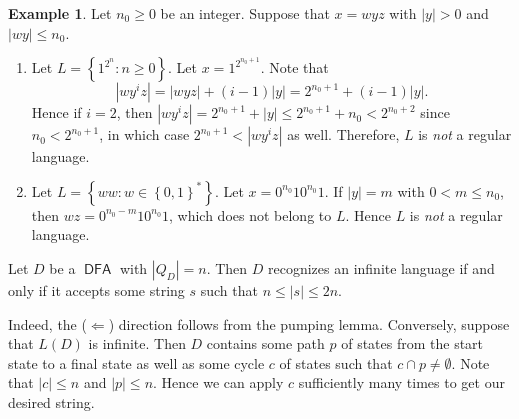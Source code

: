 \documentclass[10pt,letterpaper,cm]{nupset}
\theoremstyle{definition}
\newtheorem{exmp}[definition]{Example}
\theoremstyle{theorem}
\theoremstyle{remark}
\newcommand{\1}{\mathbf{1}}
\newcommand{\0}{\vec 0}
\DeclareMathOperator{\DFA}{\mathsf{DFA}}
\begin{document}
\begin{exmp} Let $n_0\geq 0$ be an integer. Suppose that $x=wyz$ with $\left\lvert{y}\right\rvert >0$ and $\left\lvert{wy}\right\rvert\leq n_0$.
\begin{enumerate}
\item Let $L=  \left\{ 1^{2^n} : n\geq 0\right\}$. Let $x= 1^{2^{n_0+1}}$.  Note that $$\left\lvert{wy^iz}\right\rvert = \left\lvert{wyz}\right\rvert + (i-1)\left\lvert{y}\right\rvert = 2^{n_0+1} + (i-1)\left\lvert{y}\right\rvert.$$ Hence if $i=2$, then $\left\lvert{wy^i z}\right\rvert = 2^{n_0+1} +\left\lvert{y}\right\rvert \leq 2^{n_0+1} +n_0 < 2^{n_0+2}$ since $n_0 < 2^{n_0+1}$, in which case $2^{n_0+1} < \left\lvert{wy^i z}\right\rvert$ as well. Therefore, $L$ is \emph{not} a regular language. 
\item Let $L = \left\{ ww : w \in \left\{0,1\right\}^{\ast}\right\}$. Let $x= 0^{n_0}10^{n_0}1$. If $\left\lvert{y}\right\rvert= m$ with $0<m\leq n_0$,  then $wz= 0^{n_0-m}10^{n_0}1$, which does not belong to $L$. Hence $L$ is \emph{not} a regular language. 
\end{enumerate}
\end{exmp}

\medskip

Let $D$ be a $\DFA$ with $\left\lvert{Q_D}\right\rvert =n$. Then $D$ recognizes an infinite language if and only if it accepts some string $s$ such that $n\leq \left\lvert{s}\right\rvert \leq 2n$.

Indeed, the ($\Longleftarrow$) direction follows from the pumping lemma. Conversely, suppose that $L(D)$ is infinite. Then $D$ contains some path $p$ of states from the start state to a final state as well as some cycle $c$ of states  such that $c \cap p \ne \emptyset$. Note that $\left\lvert{c}\right\rvert \leq n$ and $\left\lvert{p}\right\rvert \leq n$. Hence we can apply $c$ sufficiently many times to get our desired string.

\medskip
\end{document}
